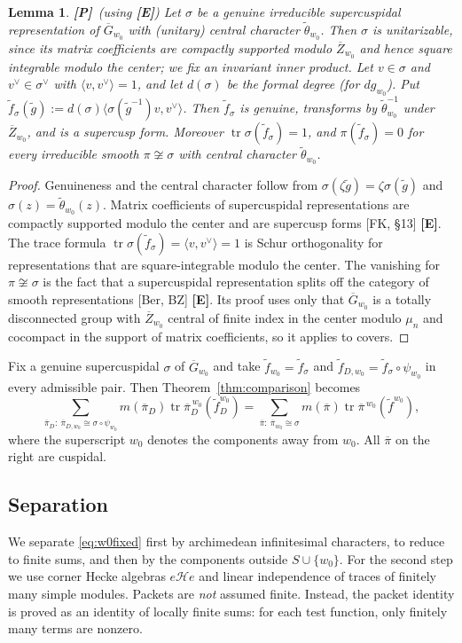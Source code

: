 \documentclass[12pt]{article}
\newcommand{\ov}[1]{\overline{#1}}
\newcommand{\tr}{\operatorname{tr}}
\newcommand{\Gb}{\ov{G}}
\newcommand{\Zb}{\ov{Z}}
\newcommand{\pib}{\ov{\pi}}
\newcommand{\Pv}{\textbf{[P]}}
\newcommand{\Ev}{\textbf{[E]}}
\theoremstyle{plain}
\newtheorem{lemma}[theorem]{Lemma}
\theoremstyle{definition}
\begin{document}
\begin{lemma}\label{lem:supercusp}\Pv\ (using \Ev)
Let $\sigma$ be a genuine irreducible supercuspidal representation of $\Gb_{w_0}$ with (unitary) central character $\tilde\theta_{w_0}$. Then $\sigma$ is unitarizable, since its matrix coefficients are compactly supported modulo $\Zb_{w_0}$ and hence square integrable modulo the center; we fix an invariant inner product. Let $v\in\sigma$ and $v^\vee\in\sigma^\vee$ with $\langle v,v^\vee\rangle=1$, and let $d(\sigma)$ be the formal degree (for $dg_{w_0}$). Put $\tilde f_\sigma(\tilde g):=d(\sigma)\langle\sigma(\tilde g^{-1})v,v^\vee\rangle$. Then $\tilde f_\sigma$ is genuine, transforms by $\tilde\theta_{w_0}^{-1}$ under $\Zb_{w_0}$, and is a supercusp form. Moreover $\tr\sigma(\tilde f_\sigma)=1$, and $\pi(\tilde f_\sigma)=0$ for every irreducible smooth $\pi\not\cong\sigma$ with central character $\tilde\theta_{w_0}$.
\end{lemma}
\begin{proof}
Genuineness and the central character follow from $\sigma(\zeta\tilde g)=\zeta\sigma(\tilde g)$ and $\sigma(z)=\tilde\theta_{w_0}(z)$. Matrix coefficients of supercuspidal representations are compactly supported modulo the center and are supercusp forms [FK, \S13] \Ev. The trace formula $\tr\sigma(\tilde f_\sigma)=\langle v,v^\vee\rangle=1$ is Schur orthogonality for representations that are square-integrable modulo the center. The vanishing for $\pi\not\cong\sigma$ is the fact that a supercuspidal representation splits off the category of smooth representations [Ber, BZ] \Ev. Its proof uses only that $\Gb_{w_0}$ is a totally disconnected group with $\Zb_{w_0}$ central of finite index in the center modulo $\mu_n$ and cocompact in the support of matrix coefficients, so it applies to covers.
\end{proof}

Fix a genuine supercuspidal $\sigma$ of $\Gb_{w_0}$ and take $\tilde f_{w_0}=\tilde f_\sigma$ and $\tilde f_{D,w_0}=\tilde f_\sigma\circ\psi_{w_0}$ in every admissible pair. Then Theorem~\ref{thm:comparison} becomes
\begin{equation}\label{eq:w0fixed}
\sum_{\pib_D:\ \pib_{D,w_0}\cong\sigma\circ\psi_{w_0}}m(\pib_D)\tr\pib_D^{\,w_0}(\tilde f_D^{w_0})=\sum_{\pib:\ \pib_{w_0}\cong\sigma}m(\pib)\tr\pib^{\,w_0}(\tilde f^{w_0}),
\end{equation}
where the superscript $w_0$ denotes the components away from $w_0$. All $\pib$ on the right are cuspidal.

\subsection{Separation}\label{subsec:sep}
We separate \eqref{eq:w0fixed} first by archimedean infinitesimal characters, to reduce to finite sums, and then by the components outside $S\cup\{w_0\}$. For the second step we use corner Hecke algebras $e\mathcal He$ and linear independence of traces of finitely many simple modules. Packets are \emph{not} assumed finite. Instead, the packet identity is proved as an identity of locally finite sums: for each test function, only finitely many terms are nonzero.
\end{document}
